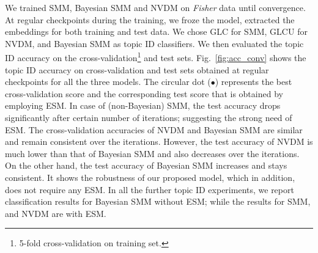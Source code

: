\documentclass[journal]{IEEEtran}
\begin{document}
We trained SMM, Bayesian SMM and NVDM on \textit{Fisher} data until 
convergence. At regular checkpoints during the training, we froze the model, 
extracted the embeddings for both training and test data. We chose GLC for SMM, 
GLCU for NVDM, and Bayesian SMM as topic ID classifiers. We then evaluated 
the topic ID accuracy on the cross-validation\footnote{5-fold cross-validation 
on training set.} and test sets.  Fig.~\ref{fig:acc_conv} shows the topic ID 
accuracy on cross-validation and test sets obtained at regular checkpoints for 
all the three models. The circular dot (\(\bullet\)) represents the best 
cross-validation score and the corresponding test score that is obtained by 
employing ESM. In case of (non-Bayesian) SMM, the test 
accuracy drops significantly after certain number of iterations; suggesting the 
strong need of ESM. The cross-validation accuracies of NVDM and 
Bayesian SMM are similar and remain consistent over the iterations. However, 
the test 
accuracy of NVDM is much lower than that of Bayesian SMM and also decreases 
over the iterations. On the other hand, the test accuracy of Bayesian SMM 
increases and stays consistent. It shows the robustness of our proposed model, 
which in addition, does not require any ESM. In all the further 
topic ID experiments, we report classification results for Bayesian SMM without 
ESM; while the results for SMM, and NVDM are with ESM.
\end{document}
